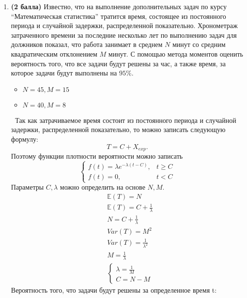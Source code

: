 \documentclass{assignment}
\begin{document}
\begin{enumerate}
    \item \textbf{(2 балла)} Известно, что на выполнение дополнительных задач по курсу ``Математическая статистика'' тратится время, состоящее из постоянного периода и случайной задержки, распределенной показательно. Хронометраж затраченного времени за последние несколько лет по выполнению задач для должников показал, что работа занимает в среднем $N$ минут со средним квадратическим отклонением $M$ минут. С помощью метода моментов оценить вероятность того, что все задачи будут решены за час, а также время, за которое задачи будут выполнены на $95\%$. 
    \begin{itemize}
        \item $N = 45, M = 15$
        \item $N = 40, M = 8$
    \end{itemize}
    \textcolor{white}{.}
    \start
    Так как затрачиваемое время состоит из постоянного периода и случайной задержки, распределенной показательно, то можно записать следующую формулу:
    \begin{equation}
        T = C + X_{exp}.
    \end{equation}
    Поэтому функции плотности вероятности можно записать
    \begin{equation}
        \begin{cases}
            f(t) = \lambda e^{-\lambda (t - C)}, &t \geq C \\
            f(t) = 0, &t < C
        \end{cases}
    \end{equation}
    Параметры $C, \lambda$ можно определить на основе $N, M$.
    \begin{align*}
        &\mathbb{E}(T) = N \\
        &\mathbb{E}(T) = C + \frac{1}{\lambda} \\
        &N = C + \frac{1}{\lambda} \\
        &Var(T) = M^2 \\
        &Var(T) = \frac{1}{\lambda^2} \\
        &M = \frac{1}{\lambda} \\
        &\begin{cases}
            \lambda = \frac{1}{M} \\
            C = N - M
        \end{cases}
    \end{align*}
    Вероятность того, что задачи будут решены за определенное время t:
    \begin{align*}

\end{align*}
\end{enumerate}
\end{document}
